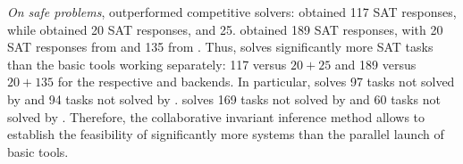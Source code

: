 \textit{On safe problems}, \theringenCICI{} outperformed competitive solvers: \ringenCICI{\cvc{}} obtained 117 SAT responses, while \racer{} obtained 20 SAT responses, and \ringen{\cvc{}} 25. \ringenCICI{\vampire{}} obtained 189 SAT responses, with 20 SAT responses from \racer{} and 135 from \ringen{\vampire{}}.
Thus, \theringenCICI{} solves significantly more SAT tasks than the basic tools working separately: 117 versus $20+25$ and 189 versus $20+135$ for the respective \cvc{} and \vampire{} backends.
In particular, \ringenCICI{\cvc{}} solves 97 tasks not solved by \racer{} and 94 tasks not solved by \ringen{\cvc{}}.
\ringenCICI{\vampire{}} solves 169 tasks not solved by \racer{} and 60 tasks not solved by \ringen{\vampire{}}.
Therefore, the collaborative invariant inference method allows to establish the feasibility of significantly more systems than the parallel launch of basic tools.

